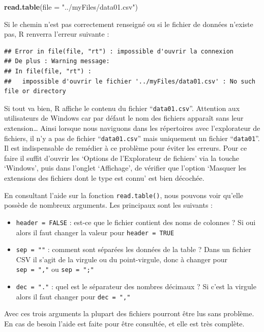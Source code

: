 \documentclass[
]{book}
\newenvironment{Shaded}{\begin{snugshade}}{\end{snugshade}}
\newcommand{\DataTypeTok}[1]{\textcolor[rgb]{0.13,0.29,0.53}{#1}}
\newcommand{\KeywordTok}[1]{\textcolor[rgb]{0.13,0.29,0.53}{\textbf{#1}}}
\newcommand{\NormalTok}[1]{#1}
\newcommand{\StringTok}[1]{\textcolor[rgb]{0.31,0.60,0.02}{#1}}
\providecommand{\tightlist}{%
  \setlength{\itemsep}{0pt}\setlength{\parskip}{0pt}}
\begin{document}
\begin{Shaded}
\begin{Highlighting}[]
\KeywordTok{read.table}\NormalTok{(}\DataTypeTok{file =} \StringTok{"../myFiles/data01.csv"}\NormalTok{)}
\end{Highlighting}
\end{Shaded}

Si le chemin n'est pas correctement renseigné ou si le fichier de données n'existe pas, R renverra l'erreur suivante :

\begin{verbatim}
## Error in file(file, "rt") : impossible d'ouvrir la connexion
## De plus : Warning message:
## In file(file, "rt") :
##   impossible d'ouvrir le fichier '../myFiles/data01.csv' : No such file or directory
\end{verbatim}

Si tout va bien, R affiche le contenu du fichier ``\texttt{data01.csv}''. Attention aux utilisateurs de Windows car par défaut le nom des fichiers apparaît sans leur extension\ldots{} Ainsi lorsque nous naviguons dans les répertoires avec l'explorateur de fichiers, il n'y a pas de fichier ``\texttt{data01.csv}'' mais uniquement un fichier ``\texttt{data01}''. Il est indispensable de remédier à ce problème pour éviter les erreurs. Pour ce faire il suffit d'ouvrir les `Options de l'Explorateur de fichiers' via la touche `Windows', puis dans l'onglet `Affichage', de vérifier que l'option `Masquer les extensions des fichiers dont le type est connu' est bien décochée.

En consultant l'aide sur la fonction \texttt{read.table()}, nous pouvons voir qu'elle possède de nombreux arguments. Les principaux sont les suivants :

\begin{itemize}
\tightlist
\item
  \texttt{header\ =\ FALSE} : est-ce que le fichier contient des noms de colonnes ? Si oui alors il faut changer la valeur pour \texttt{header\ =\ TRUE}
\item
  \texttt{sep\ =\ ""} : comment sont séparées les données de la table ? Dans un fichier CSV il s'agit de la virgule ou du point-virgule, donc à changer pour \texttt{sep\ =\ ","} ou \texttt{sep\ =\ ";"}
\item
  \texttt{dec\ =\ "."} : quel est le séparateur des nombres décimaux ? Si c'est la virgule alors il faut changer pour \texttt{dec\ =\ ","}
\end{itemize}

Avec ces trois arguments la plupart des fichiers pourront être lus sans problème. En cas de besoin l'aide est faite pour être consultée, et elle est très complète.
\end{document}
